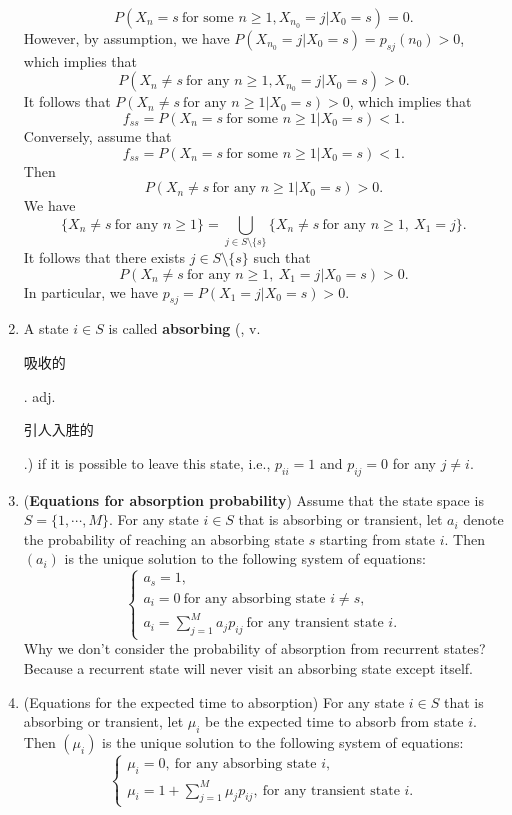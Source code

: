\documentclass[12pt,letterpaper, onecolumn]{exam}
\begin{document}
\begin{enumerate}
    $$P(X_n=s\ \text{for some }n\ge 1, X_{n_0}=j|X_0=s)=0.$$
    However, by assumption, we have $P(X_{n_0}=j|X_0=s)=p_{sj}(n_0)>0$, which implies that 
    $$P(X_n\ne s\ \text{for any }n\ge 1,X_{n_0}=j|X_{0}=s)>0.$$
    It follows that $P(X_n\ne s\ \text{for any }n\ge 1|X_0=s)>0$, which implies that 
    $$f_{ss}=P(X_n=s\ \text{for some }n\ge 1|X_0=s)<1.$$
    \quad Conversely, assume that 
    $$f_{ss}=P(X_n=s\ \text{for some }n\ge 1|X_0=s)<1.$$
    Then 
    $$P(X_n\ne s\ \text{for any }n\ge 1|X_{0}=s)>0.$$
    We have 
    $$\{X_n\ne s\ \text{for any }n\ge 1\}=\bigcup_{j\in S\setminus\{s\}}\{X_n\ne s\ \text{for any }n\ge 1,\ X_1=j\}.$$
    It follows that 
    there exists $j\in S\setminus\{s\}$ such that 
    $$P(X_n\ne s\ \text{for any }n\ge 1,\ X_1=j|X_0=s)>0.$$
    In particular, we have $p_{sj}=P(X_1=j|X_0=s)>0$.
    \item A state $i\in S$ is called \textbf{absorbing} (, v. \begin{CJK}{UTF8}{gbsn}吸收的\end{CJK}.  adj. \begin{CJK}{UTF8}{gbsn}引人入胜的\end{CJK}.) if it is possible to leave this state, i.e., $p_{ii}=1$ and $p_{ij}=0$ for any $j\ne i$.
    \item (\textbf{Equations for absorption probability}) Assume that the state space is $S=\{1,\cdots,M\}$. For any state $i\in S$ that is absorbing or transient, let $a_i$ denote the probability of reaching an absorbing state $s$ starting from state $i$. Then $(a_i)$ is the unique solution to the following system of equations:
    $$
    \begin{cases}
        a_s=1,\\
        a_i=0\ \text{for any absorbing state $i\ne s$},\\
        a_i=\sum\limits_{j=1}^Ma_jp_{ij}\ \text{for any transient state $i$}.
    \end{cases}
    $$
    Why we don't consider the probability of absorption from recurrent states? Because a recurrent state will never visit an absorbing state except itself.
    \item (Equations for the expected time to absorption) For any state $i\in S$ that is absorbing or transient, let $\mu_i$ be the expected time to absorb from state $i$. Then $(\mu_i)$ is the unique solution to the following system of equations:
    \begin{equation}
        \begin{cases}
            \mu_i=0,\ \text{for any absorbing state $i$},\\
            \mu_i=1+\sum\limits_{j=1}^M\mu_jp_{ij},\ \text{for any transient state $i$}.
        \end{cases}
    \end{equation}
    \end{enumerate}
\end{document}
